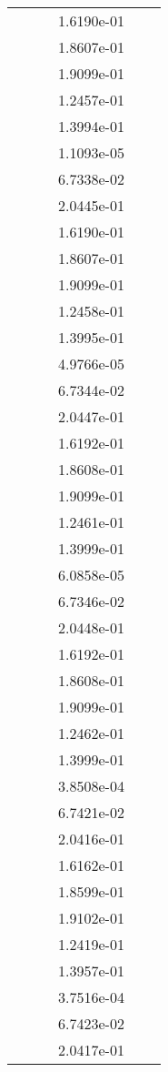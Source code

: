 \begin{xltabular}{\textwidth}{r|rS[table-format=1.3e+2]S[table-format=1.4e+2]S[table-format=1.4e+2]S[table-format=-1.5]}
&  &  & 1.6190e-01 & & \\
&  &  & 1.8607e-01 & & \\
&  &  & 1.9099e-01 & & \\
&  &  & 1.2457e-01 & & \\
&  &  & 1.3994e-01 & & \\
&  &  & 1.1093e-05 & & \\
&  &  & 6.7338e-02 & & \\
&  &  & 2.0445e-01 & & \\
&  &  & 1.6190e-01 & & \\
&  &  & 1.8607e-01 & & \\
&  &  & 1.9099e-01 & & \\
&  &  & 1.2458e-01 & & \\
&  &  & 1.3995e-01 & & \\
&  &  & 4.9766e-05 & & \\
&  &  & 6.7344e-02 & & \\
&  &  & 2.0447e-01 & & \\
&  &  & 1.6192e-01 & & \\
&  &  & 1.8608e-01 & & \\
&  &  & 1.9099e-01 & & \\
&  &  & 1.2461e-01 & & \\
&  &  & 1.3999e-01 & & \\
&  &  & 6.0858e-05 & & \\
&  &  & 6.7346e-02 & & \\
&  &  & 2.0448e-01 & & \\
&  &  & 1.6192e-01 & & \\
&  &  & 1.8608e-01 & & \\
&  &  & 1.9099e-01 & & \\
&  &  & 1.2462e-01 & & \\
&  &  & 1.3999e-01 & & \\
&  &  & 3.8508e-04 & & \\
&  &  & 6.7421e-02 & & \\
&  &  & 2.0416e-01 & & \\
&  &  & 1.6162e-01 & & \\
&  &  & 1.8599e-01 & & \\
&  &  & 1.9102e-01 & & \\
&  &  & 1.2419e-01 & & \\
&  &  & 1.3957e-01 & & \\
&  &  & 3.7516e-04 & & \\
&  &  & 6.7423e-02 & & \\
&  &  & 2.0417e-01 & & \\

\end{xltabular}
